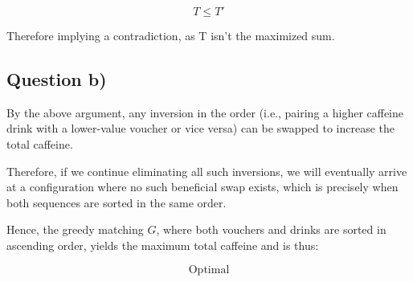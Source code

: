 \documentclass[12pt]{article}
\begin{document}
\[
\boxed{T \le T'} 
\]

Therefore implying a contradiction, as T isn't the maximized sum.  

\subsection*{Question b)}

By the above argument, any inversion in the order (i.e., pairing a higher caffeine drink with a lower-value voucher or vice versa) can be swapped to increase the total caffeine.

Therefore, if we continue eliminating all such inversions, we will eventually arrive at a configuration where no such beneficial swap exists, which is precisely when both sequences are sorted in the same order.

Hence, the greedy matching $G$, where both vouchers and drinks are sorted in ascending order, yields the maximum total caffeine and is thus:

\[
\boxed{\text{Optimal}}
\]
\end{document}
